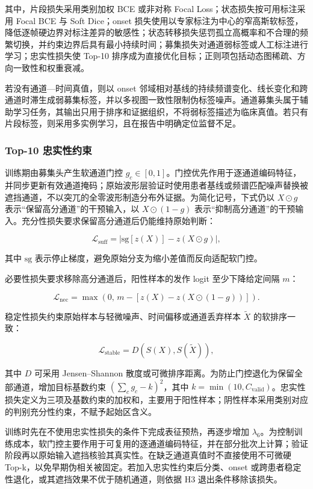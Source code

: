 \documentclass{cumcmthesis_v2}
\numberwithin{figure}{section} %
\numberwithin{table}{section} %
\begin{document}
其中，片段损失采用类别加权 BCE 或非对称 Focal Loss；状态损失按可用标注采用 Focal BCE 与 Soft Dice；onset 损失使用以专家标注为中心的窄高斯软标签，降低逐帧硬边界对标注差异的敏感性；状态转移损失惩罚孤立高概率和不合理的频繁切换，并约束边界后具有最小持续时间；募集损失对通道弱标签或人工标注进行学习；忠实性损失使 Top-10 排序成为直接优化目标；正则项包括动态图稀疏、方向一致性和权重衰减。

若没有通道—时间真值，则以 onset 邻域相对基线的持续频谱变化、线长变化和跨通道时滞生成弱募集标签，并以多视图一致性限制伪标签噪声。通道募集头属于辅助学习任务，其输出只用于排序和证据组织，不将弱标签描述为临床真值。若只有片段标签，则采用多实例学习，且在报告中明确定位监督不足。

\subsubsection{Top-10 忠实性约束}

训练期由募集头产生软通道门控 $g_c\in[0,1]$。门控优先作用于逐通道编码特征，并同步更新有效通道掩码；原始波形层验证时使用患者基线或频谱匹配噪声替换被遮挡通道，不以突兀的全零波形制造分布外证据。为简化记号，下式仍以 $X\odot g$ 表示“保留高分通道”的干预输入，以 $X\odot(1-g)$ 表示“抑制高分通道”的干预输入。充分性损失要求保留高分通道后仍能维持原始判断：

$$
\mathcal{L}_{\mathrm{suff}}=
\left|\mathrm{sg}[z(X)]-z(X\odot g)\right|,
$$

其中 $\mathrm{sg}$ 表示停止梯度，避免原始分支为缩小差值而反向适配软门控。

必要性损失要求移除高分通道后，阳性样本的发作 logit 至少下降给定间隔 $m$：

$$
\mathcal{L}_{\mathrm{nec}}=
\max\left(0,\,
m-[z(X)-z(X\odot(1-g))]
\right).
$$

稳定性损失约束原始样本与轻微噪声、时间偏移或通道丢弃样本 $\tilde X$ 的软排序一致：

$$
\mathcal{L}_{\mathrm{stable}}=
D\left(S(X),S(\tilde X)\right),
$$

其中 $D$ 可采用 Jensen–Shannon 散度或可微排序距离。为防止门控退化为保留全部通道，增加目标基数约束 $\left(\sum_c g_c-k\right)^2$，其中 $k=\min(10,C_{\mathrm{valid}})$。忠实性损失定义为三项及基数约束的加权和，主要用于阳性样本；阴性样本采用类别对应的判别充分性约束，不赋予起始区含义。

训练时先在不使用忠实性损失的条件下完成表征预热，再逐步增加 $\lambda_6$。为控制训练成本，软门控主要作用于可复用的逐通道编码特征，并在部分批次上计算；验证阶段再以原始输入遮挡核验其真实性。在缺乏通道真值时不直接使用不可微硬 Top-k，以免早期伪相关被固定。若加入忠实性约束后分类、onset 或跨患者稳定性退化，或其遮挡效果不优于随机通道，则依据 H3 退出条件移除该损失。
\end{document}
